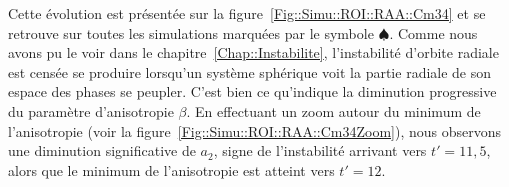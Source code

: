 		Cette évolution est présentée sur la figure~\ref{Fig::Simu::ROI::RAA::Cm34} et se retrouve
		sur toutes les simulations marquées par le symbole $\spadesuit$. Comme nous avons pu le voir dans le chapitre~\ref{Chap::Instabilite},
		l'instabilité d'orbite radiale est censée se produire lorsqu'un système sphérique voit la partie radiale de son espace des phases se
		peupler. C'est bien ce qu'indique la diminution progressive du paramètre d'anisotropie $\beta$.
		En effectuant un zoom autour du
		minimum de l'anisotropie (voir la figure~\ref{Fig::Simu::ROI::RAA::Cm34Zoom}), nous observons une diminution significative de $a_2$,
		signe de l'instabilité arrivant vers $t'=11,5$, alors que le minimum de l'anisotropie est atteint vers $t'=12$.

